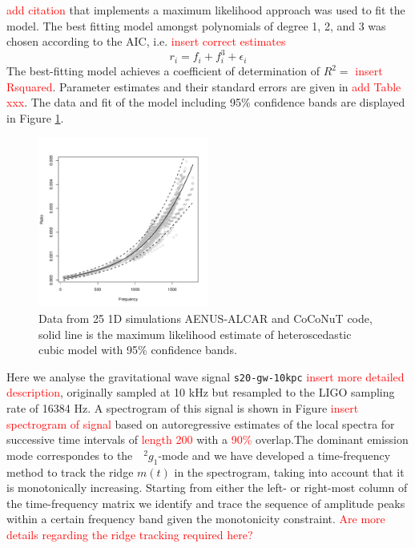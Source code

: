 {\textcolor{red}{add citation} that implements a maximum likelihood approach was used to fit the model. The
best fitting model amongst polynomials of degree 1, 2, and 3  was chosen according to the  AIC, i.e. \textcolor{red}{insert correct estimates}
\begin{equation}\label{eq:universal}
r_i=f_i + f_i^3 + \epsilon_i
\end{equation}
 The best-fitting model achieves a coefficient of determination of $R^2=$  \textcolor{red}{insert Rsquared}.
Parameter estimates and their standard errors are given in \textcolor{red}{ add Table xxx}.
The data and fit of the model including 95\% confidence bands are displayed in Figure \ref{Fig:LMVAR}.
\begin{figure}
 \centering
 	\includegraphics[width=0.5\textwidth,height=0.3\textheight]{model.pdf}
 \caption{Data from 25 1D simulations {\sc AENUS-ALCAR } and {\sc CoCoNuT}  code, solid line is the maximum likelihood estimate of heteroscedastic cubic model with 95\% confidence bands.} \label{Fig:LMVAR}
\end{figure}

Here we analyse the gravitational wave signal {\tt s20-gw-10kpc} \textcolor{red}{insert more detailed description}, originally sampled at 10 kHz but resampled to the LIGO sampling rate of 16384 Hz.
A spectrogram of this signal is shown in Figure \textcolor{red}{insert spectrogram of signal} based on autoregressive estimates of the local spectra for successive time intervals of 
\textcolor{red}{length 200} with a \textcolor{red}{ 90\%} overlap.The dominant emission mode correspondes to the $\mbox{ }^2 g_1$-mode \cite{} and we have developed a time-frequency method to track the ridge $m(t)$ in the spectrogram, taking into account that it is monotonically increasing. Starting from either the left- or right-most column of the time-frequency  matrix we identify and trace the sequence of amplitude peaks within a certain frequency band given the monotonicity constraint. \textcolor{red}{Are more details regarding the ridge tracking required here?}

}
